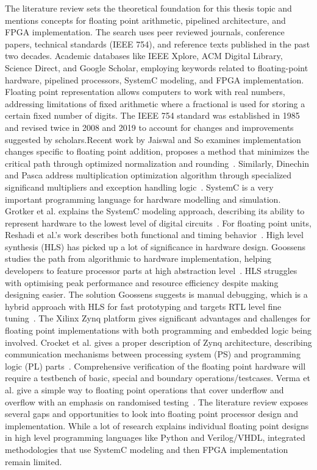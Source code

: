 The literature review sets the theoretical foundation for this thesis topic and mentions concepts for floating point arithmetic, pipelined architecture, and FPGA implementation. The search uses peer reviewed journals, conference papers, technical standards (IEEE 754), and reference texts published in the past two decades. Academic databases like IEEE Xplore, ACM Digital Library, Science Direct, and Google Scholar, employing keywords related to floating-point hardware, pipelined processors, SystemC modeling, and FPGA implementation. 
Floating point representation allows computers to work with real numbers, addressing limitations of fixed arithmetic where a fractional is used for storing a certain fixed number of digits. The IEEE 754 standard was established in 1985 and revised twice in 2008 and 2019 to account for changes and improvements suggested by scholars.Recent work by Jaiswal and So examines implementation changes specific to floating point addition, proposes a method that minimizes the critical path through optimized normalization and rounding~\cite{ref8}. Similarly, Dinechin and Pasca address multiplication optimization algorithm through specialized significand multipliers and exception handling logic~\cite{ref9}. 
SystemC is a very important programming language for hardware modelling and simulation. Grotker et al. explains the SystemC modeling approach, describing its ability to represent hardware to the lowest level of digital circuits~\cite{ref11}. For floating point units, Reshadi et al.'s work describes both functional and timing behavior~\cite{ref12}. High level synthesis (HLS) has picked up a lot of significance in hardware design. Goossens studies the path from algorithmic to hardware implementation, helping developers to feature processor parts at high abstraction level~\cite{ref13}. HLS struggles with optimising peak performance and resource efficiency despite making designing easier. The solution Goossens suggests is manual debugging, which is a hybrid approach with HLS for fast prototyping and targets RTL level fine tuning~\cite{ref13}.
The Xilinx Zynq platform gives significant advantages and challenges for floating point implementations with both programming and embedded logic being involved. Crocket et al. gives a proper description of Zynq architecture, describing communication mechanisms between processing system (PS) and programming logic (PL) parts~\cite{ref14}. Comprehensive verification of the floating point hardware will require a testbench of basic, special and boundary operations/testcases. Verma et al. give a simple way to floating point operations that cover underflow and overflow with an emphasis on randomised testing~\cite{ref15}.
The literature review exposes several gaps and opportunities to look into floating point processor design and implementation. While a lot of research explains individual floating point designs in high level programming languages like Python and Verilog/VHDL, integrated methodologies that use SystemC modeling and then FPGA implementation remain limited.